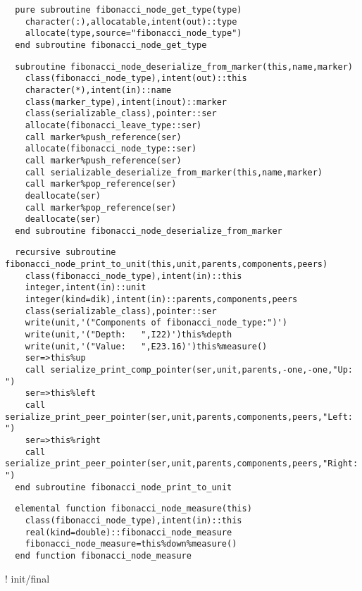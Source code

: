 \begin{Verbatim}
  pure subroutine fibonacci_node_get_type(type)
    character(:),allocatable,intent(out)::type
    allocate(type,source="fibonacci_node_type")
  end subroutine fibonacci_node_get_type
\end{Verbatim}
  
\begin{Verbatim}
  subroutine fibonacci_node_deserialize_from_marker(this,name,marker)
    class(fibonacci_node_type),intent(out)::this
    character(*),intent(in)::name
    class(marker_type),intent(inout)::marker
    class(serializable_class),pointer::ser
    allocate(fibonacci_leave_type::ser)
    call marker%push_reference(ser)
    allocate(fibonacci_node_type::ser)
    call marker%push_reference(ser)
    call serializable_deserialize_from_marker(this,name,marker)
    call marker%pop_reference(ser)
    deallocate(ser)
    call marker%pop_reference(ser)
    deallocate(ser)    
  end subroutine fibonacci_node_deserialize_from_marker
\end{Verbatim}
    
\begin{Verbatim}
  recursive subroutine fibonacci_node_print_to_unit(this,unit,parents,components,peers)
    class(fibonacci_node_type),intent(in)::this
    integer,intent(in)::unit
    integer(kind=dik),intent(in)::parents,components,peers
    class(serializable_class),pointer::ser
    write(unit,'("Components of fibonacci_node_type:")')
    write(unit,'("Depth:   ",I22)')this%depth
    write(unit,'("Value:   ",E23.16)')this%measure()
    ser=>this%up
    call serialize_print_comp_pointer(ser,unit,parents,-one,-one,"Up:     ")
    ser=>this%left
    call serialize_print_peer_pointer(ser,unit,parents,components,peers,"Left:   ")
    ser=>this%right
    call serialize_print_peer_pointer(ser,unit,parents,components,peers,"Right:  ")
  end subroutine fibonacci_node_print_to_unit
\end{Verbatim}

\begin{Verbatim}
  elemental function fibonacci_node_measure(this)
    class(fibonacci_node_type),intent(in)::this
    real(kind=double)::fibonacci_node_measure
    fibonacci_node_measure=this%down%measure()
  end function fibonacci_node_measure
\end{Verbatim}

  ! init/final

